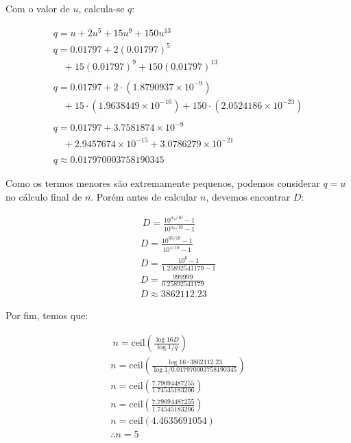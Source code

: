 Com o valor de $u$, calcula-se $q$:

\begin{align*}
    q = u + 2u^5 + 15u^9 + 150u^{13}                                                     \\
    q = 0.01797 + 2(0.01797)^5                                                           \\
    \quad + 15(0.01797)^9 + 150(0.01797)^{13}                                            \\
    \\
    q = 0.01797 + 2 \cdot (1.8790937 \times 10^{-9})                                     \\
    \quad + 15 \cdot (1.9638449 \times 10^{-16}) + 150 \cdot (2.0524186 \times 10^{-23}) \\
    \\
    q = 0.01797 + 3.7581874 \times 10^{-9}                                               \\
    \quad + 2.9457674 \times 10^{-15} + 3.0786279 \times 10^{-21}                        \\
    \\
    q \approx 0.017970003758190345
\end{align*}


Como os termos menores são extremamente pequenos, podemos considerar $q=u$ no cálculo final de $n$.
Porém antes de calcular $n$, devemos encontrar $D$:

\begin{align*} \
    D = \frac{10^{\alpha_s / 10} - 1}{10^{\alpha_p / 10} - 1} \\
    D = \frac{10^{60 / 10} - 1}{10^{1 / 10} - 1}              \\
    D = \frac{10^{6} - 1}{1.25892541179 - 1}                  \\
    D = \frac{999999}{0.25892541179}                          \\
    D \approx 3862112.23
\end{align*}

Por fim, temos que:

\begin{align*} \
    n = \text{ceil} \left( \frac{\log{16D}}{\log{1/q}} \right)                                    \\
    n = \text{ceil} \left( \frac{\log{16 \cdot 3862112.23}}{\log{1/0.017970003758190345}} \right) \\
    n = \text{ceil} \left( \frac{7.79094487255}{1.74545183206} \right)                            \\
    n = \text{ceil} \left( \frac{7.79094487255}{1.74545183206} \right)                            \\
    n = \text{ceil} (4.4635691054)                                                                \\
    \therefore n = 5
\end{align*}

